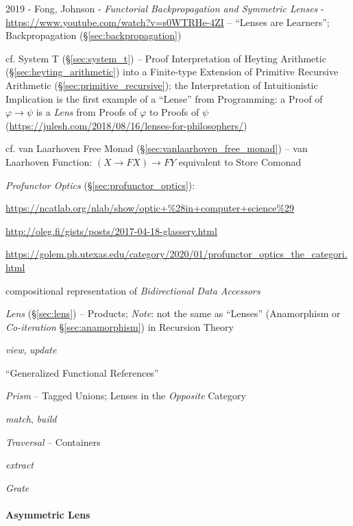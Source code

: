 2019 - Fong, Johnson - \emph{Functorial Backpropagation and Symmetric Lenses} -
\url{https://www.youtube.com/watch?v=s0WTRHe-4ZI} -- ``Lenses are Learners'';
\fist Backpropagation (\S\ref{sec:backpropagation})

\fist cf. System T (\S\ref{sec:system_t}) -- Proof Interpretation of Heyting
Arithmetic (\S\ref{sec:heyting_arithmetic}) into a Finite-type Extension of
Primitive Recursive Arithmetic (\S\ref{sec:primitive_recursive}); the
Interpretation of Intuitionistic Implication is the first example of a ``Lense''
from Programming: a Proof of $\varphi \rightarrow \psi$ is a \emph{Lens} from
Proofs of $\varphi$ to Proofs of $\psi$
(\url{https://julesh.com/2018/08/16/lenses-for-philosophers/})

\fist cf. van Laarhoven Free Monad (\S\ref{sec:vanlaarhoven_free_monad}) -- van
Laarhoven Function: $(X \rightarrow F X) \rightarrow F Y$ equivalent to Store
Comonad

\emph{Profunctor Optics} (\S\ref{sec:profunctor_optics}):


\url{https://ncatlab.org/nlab/show/optic+%28in+computer+science%29}

\url{http://oleg.fi/gists/posts/2017-04-18-glassery.html}

\url{https://golem.ph.utexas.edu/category/2020/01/profunctor_optics_the_categori.html}

compositional representation of \emph{Bidirectional Data Accessors}

\fist \emph{Lens} (\S\ref{sec:lens}) -- Products; \emph{Note}: not the same as
``Lenses'' (Anamorphism or \emph{Co-iteration} \S\ref{sec:anamorphism}) in
Recursion Theory

\emph{view}, \emph{update}

``Generalized Functional References''

\emph{Prism} -- Tagged Unions; Lenses in the \emph{Opposite} Category

\emph{match}, \emph{build}

\emph{Traversal} -- Containers

\emph{extract}

\emph{Grate}



\paragraph{Asymmetric Lens}\label{sec:asymmetric_lens}\hfill


